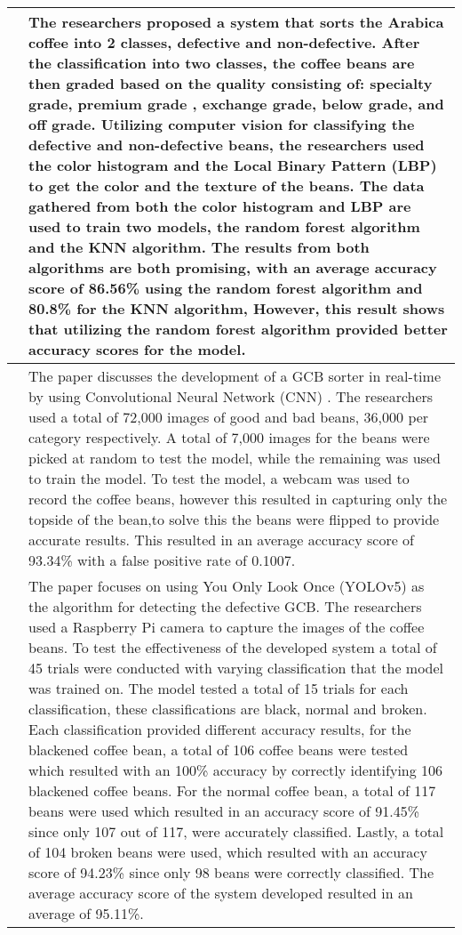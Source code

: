 \begin{center}
\begin{longtable}{| p{4cm} | p{10cm} |}
		\cite{NS_Akbar_Rachmawati_Sthevanie_2021}
		&
		The researchers proposed a system that sorts the Arabica coffee into 2 classes, defective and non-defective. After the classification into two classes, the coffee beans are then graded based on the quality consisting of: specialty grade, premium grade , exchange grade, below grade, and off grade. Utilizing computer vision for classifying the defective and non-defective beans, the researchers used the color histogram and the Local Binary Pattern (LBP) to get the color and the texture of the beans. The data gathered from both the color histogram and LBP are used to train two models, the random forest algorithm and the KNN algorithm. The results from both algorithms are both promising, with an average accuracy score of 86.56\% using the random forest algorithm and 80.8\% for the KNN algorithm, However, this result shows that utilizing the random forest algorithm provided better accuracy scores for the model. \\
		\hline

		\cite{Huang_Chou_Lee_2019}
		&
		The paper discusses the development of a GCB sorter in real-time by using Convolutional Neural Network (CNN) . The researchers used a total of 72,000 images of good and bad beans, 36,000 per category respectively. A total of 7,000 images for the beans were picked at random to test the model, while the remaining was used to train the model. To test the model, a webcam was used to record the coffee beans, however this resulted in capturing only the topside of the bean,to solve this the beans were flipped to provide accurate results. This resulted in an average accuracy score of 93.34\% with a false positive rate of 0.1007. \\
		\hline

		\cite{Luis_Quinones_Yumang_2022}
		&
		The paper focuses on using You Only Look Once (YOLOv5) as the algorithm for detecting the defective GCB. The researchers used a Raspberry Pi camera to capture the images of the coffee beans. To test the effectiveness of the developed system a total of 45 trials were conducted with varying classification that the model was trained on. The model tested a total of 15 trials for each classification, these classifications are black, normal and broken. Each classification provided different accuracy results, for the blackened coffee bean, a total of 106 coffee beans were tested which resulted with an 100\% accuracy by correctly identifying 106 blackened coffee beans. For the normal coffee bean, a total of 117 beans were used which resulted in an accuracy score of 91.45\% since only 107 out of 117, were accurately classified. Lastly, a total of 104 broken beans were used, which resulted with an accuracy score of 94.23\% since only 98 beans were correctly classified. The average accuracy score of the system developed resulted in an average of 95.11\%. \\
		\hline


\end{longtable}
\end{center}
